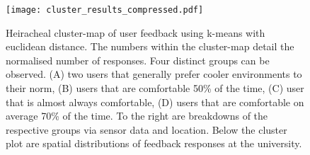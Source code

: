 



\begin{figure}
\begin{center}
\texttt{[image: cluster\_results\_compressed.pdf]}
\caption{Heiracheal cluster-map of user feedback using k-means with euclidean distance. The numbers within the cluster-map detail the normalised number of responses. Four distinct groups can be observed. (A) two users that generally prefer cooler environments to their norm, (B) users that are comfortable 50\% of the time, (C) user that is almost always comfortable, (D) users that are comfortable on average 70\% of the time. To the right are breakdowns of the respective groups via sensor data and location. Below the cluster plot are spatial distributions of feedback responses at the university.}
\label{fig:clustering}
\end{center}
\end{figure}






